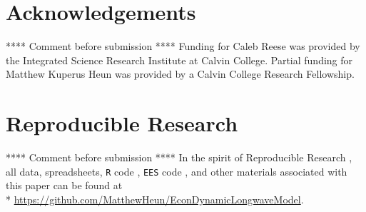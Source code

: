 \documentclass[letterpaper,12pt]{article}
\begin{document}
\section*{Acknowledgements}
\label{sec:Acknowledgements}

**** Comment before submission **** Funding for Caleb Reese was provided by the Integrated Science Research Institute at Calvin College. Partial funding for Matthew Kuperus Heun was provided by a Calvin College Research Fellowship. 

\section*{Reproducible Research}

**** Comment before submission **** In the spirit of Reproducible Research \citep{Gandrud:2013vx}, all data, spreadsheets, \texttt{R} code \citep{R}, \texttt{EES} code \citep{EES}, and other materials associated with this paper can be found at\\*
\protect\url{https://github.com/MatthewHeun/EconDynamicLongwaveModel}.





\end{document}
